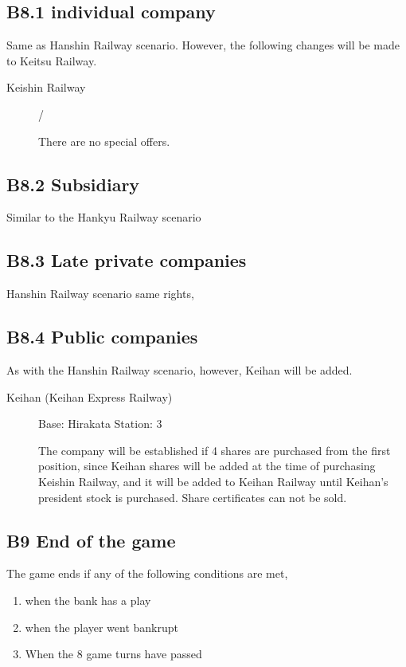 \documentclass{article}
\begin{document}
\begin{CJK}{UTF8}{min}
\subsection*{B8.1 individual company}

Same as Hanshin Railway scenario. However, the following changes will
be made to Keitsu Railway.

\begin{description}
\item[Keishin Railway]  / 

There are no special offers.
\end{description}

\subsection*{B8.2 Subsidiary}
Similar to the Hankyu Railway scenario

\subsection*{B8.3 Late private companies}
Hanshin Railway scenario same rights,

\subsection*{B8.4 Public companies}
As with the Hanshin Railway scenario, however, Keihan will be added.

\begin{description}
\item[Keihan (Keihan Express Railway)] Base: Hirakata Station: 3

The company will be established if 4 shares are purchased from the
first position, since Keihan shares will be added at the time of
purchasing Keishin Railway, and it will be added to Keihan Railway
until Keihan's president stock is purchased. Share certificates can
not be sold.
\end{description}

\subsection*{B9 End of the game}
The game ends if any of the following conditions are met,
\begin{enumerate}
\item when the bank has a play
\item when the player went bankrupt
\item When the 8 game turns have passed
\end{enumerate}


\end{CJK}
\end{document}
